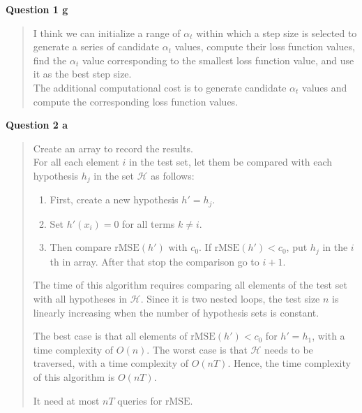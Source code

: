\documentclass[12pt,a4paper]{article}
\begin{document}
    \newpage
    \textbf{Question 1 g}
    \vspace{2mm}
    \begin{quote}
        I think we can initialize a range of $\alpha_t$ within which a step size is selected to generate a
        series of candidate $\alpha_t$ values, compute their loss function values, find the $\alpha_t$ value
        corresponding to the smallest loss function value, and use it as the best step size.\vspace{10pt}\\
        The additional computational cost is to generate candidate $\alpha_t$ values and compute the
        corresponding loss function values.
    \end{quote}

    \vspace{25mm}
    \textbf{Question 2 a}
    \vspace{2mm}
    \begin{quote}
        Create an array to record the results.\vspace{10pt}\\
        For all each element $i$ in the test set, let them be compared with each hypothesis $h_j$ in the set $\mathcal{H}$ as follows:
        \begin{enumerate}
            \item First, create a new hypothesis $h'=h_j$.
            \item Set $h'(x_i) = 0$ for all terms $k \neq i$.
            \item Then compare $\text{rMSE}(h')$ with $c_0$.
            If $\text{rMSE}(h') < c_0$, put $h_j$ in the $i$th in array.
            After that stop the comparison go to $i+1$.
        \end{enumerate}
        The time of this algorithm requires comparing all elements of the test set with all hypotheses in $\mathcal{H}$.
        Since it is two nested loops, the test size $n$ is linearly increasing when the number of hypothesis sets is
        constant.

        The best case is that all elements of $\text{rMSE}(h') < c_0$ for $h'=h_1$, with a time complexity of $O(n)$.
        The worst case is that $\mathcal{H}$ needs to be traversed, with a time complexity of $O(nT)$.
        Hence, the time complexity of this algorithm is $O(nT)$.

        It need at most $nT$ queries for $\text{rMSE}$.

    \end{quote}
\end{document}
